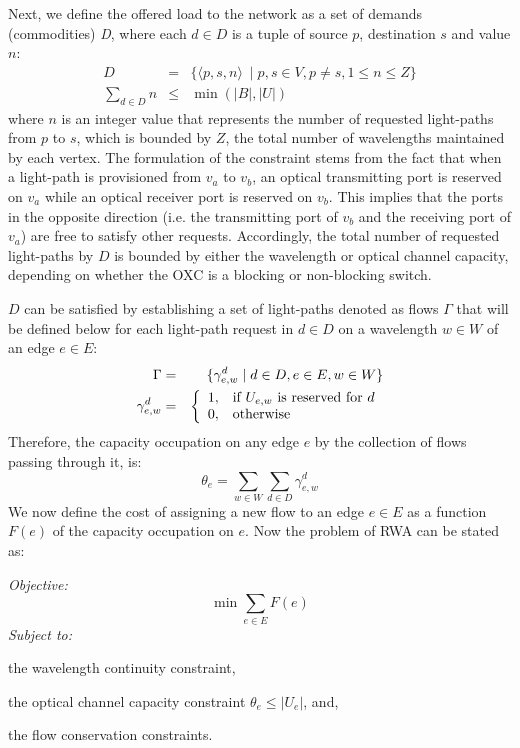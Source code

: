 \documentclass[journal]{IEEEtran}
\begin{document}
Next, we define the offered load to the network as a set of demands (commodities)
\textit{D}, where each $d \in D$ is a tuple of source $p$, destination $s$ and value $n$: 
\begin{eqnarray}
D & = & \{\langle p,s,n\rangle \ \mid p,s \in V, p \neq s , 1 \leq n \leq Z \}
\\
 \sum_{d \in D} n & \leq & \min( |B|, |U|) \nonumber
\end{eqnarray} 
where $n$ is an integer value that represents the number of
requested light-paths from $p$ to $s$, which is bounded by $Z$, the total number of
wavelengths maintained by each vertex. The formulation of the constraint stems from the fact that when a light-path is provisioned from $v_a$ to $v_b$, an optical transmitting port is reserved on $v_a$ while an optical receiver port is reserved on $v_b$. This implies that the ports in the opposite direction (i.e. the transmitting port of $v_b$ and the receiving port of $v_a$) are free to satisfy other requests. Accordingly, the total number of requested light-paths by $D$ is bounded by either the wavelength or optical channel capacity, depending on whether the OXC is a blocking or non-blocking switch.

$D$ can be satisfied by establishing a set of light-paths denoted as flows $\Gamma$ that will be defined below for each light-path request in $d \in D$ on a wavelength $w \in W$ of an edge $e \in E$:
 \begin{eqnarray}
\Gamma &=& \{\gamma_{e,w}^d \mid d \in D, e \in E, w \in W \}
\\
\gamma_{e,w}^d & =& \left\{
 \begin{array}{l l}
  1, & \textrm{if } U_{e,w} \textrm{ is reserved for } d\\ \label{eq:ipflow}
  0, & \textrm{otherwise}
 \end{array} \right.
 \end{eqnarray}
 Therefore, the capacity occupation on any edge $e$ by the collection
 of flows passing through it, is:
 \begin{equation}
 \theta_e = \sum_{w \in W} \sum_{d \in D} \gamma_{e,w} ^d
 \end{equation}
We now define the cost of assigning a new flow to an edge $e \in E$ as a function $F(e)$ of the capacity occupation on $e$. Now the problem of RWA can be stated as:

\emph{Objective:}
 \begin{equation}
 \min \sum_{e \in E} F(e)\label{eq:F_e}
 \end{equation}
\emph{ Subject to:}
 \begin{inparaenum} \item the wavelength continuity constraint, 
 \item the optical channel capacity constraint $ \theta_e \leq |U_e|$, and,
 \item the flow conservation constraints.
 \end{inparaenum} 
 
\end{document}
